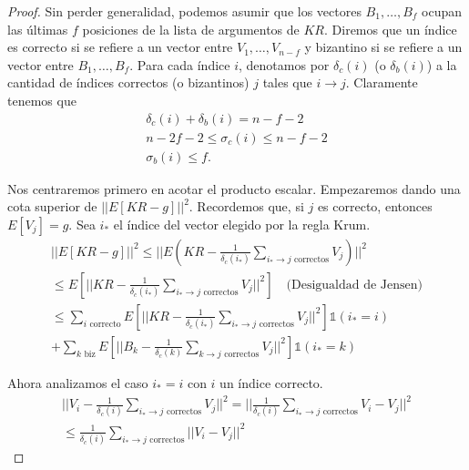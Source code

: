 \begin{proof}
	Sin perder generalidad, podemos asumir que los vectores $B_1, \ldots, B_f$ ocupan las últimas $f$ posiciones de la lista de argumentos de $KR$. Diremos que un índice es correcto si se refiere a un vector entre $V_1, \ldots, V_{n-f}$ y bizantino si se refiere a un vector entre $B_1, \ldots, B_f$. Para cada índice $i$, denotamos por $\delta_c(i)$  (o $\delta_b(i)$) a la cantidad de índices correctos (o bizantinos) $j$ tales que $i \to j$. Claramente tenemos que
	\begin{equation}\begin{split}
			\delta_c(i) + \delta_b(i) = n - f - 2 \\
			n - 2f - 2 \le \sigma_c(i) \le n-f-2 \\
			\sigma_b(i) \le f.
	\end{split}\end{equation}
	
	Nos centraremos primero en acotar el producto escalar. Empezaremos dando una cota superior de $||E[KR - g]||^2$. Recordemos que, si $j$ es correcto, entonces $E[V_j]=g$. Sea $i_*$ el índice del vector elegido por la regla Krum.
	\begin{equation}\begin{split}
			||E[KR-g]||^2 \le ||E \left( KR - \frac{1}{\delta_c(i_*)} \sum_{i_* \to j \text{ correctos}}V_j \right) ||^2 \\
			\le E[|| KR - \frac{1}{\delta_c(i_*)} \sum_{i_* \to j \text{ correctos}}V_j ||^2] \quad \text{(Desigualdad de Jensen)} \\
			\le \sum_{i \text{ correcto}} E[|| KR - \frac{1}{\delta_c(i_*)} \sum_{i_* \to j \text{ correctos}}V_j ||^2]  \mathbb{1}(i_* = i) \\
			+ \sum_{k \text{ biz}} E[||B_k - \frac{1}{\delta_c(k)} \sum_{k \to j \text{ correctos}}V_j||^2] \mathbb{1}(i_*=k)
	\end{split}\end{equation}
	
	Ahora analizamos el caso $i_* = i$ con $i$ un índice correcto.
	\begin{equation}\begin{split}
			||V_i - \frac{1}{\delta_c(i)}\sum_{i_* \to j \text{ correctos}}V_j||^2 = ||\frac{1}{\delta_c(i)}\sum_{i_* \to j \text{ correctos}}V_i - V_j||^2 \\
			\le \frac{1}{\delta_c(i)}\sum_{i_* \to j \text{ correctos}}||V_i - V_j||^2
	\end{split}\end{equation}
	

\end{proof}
